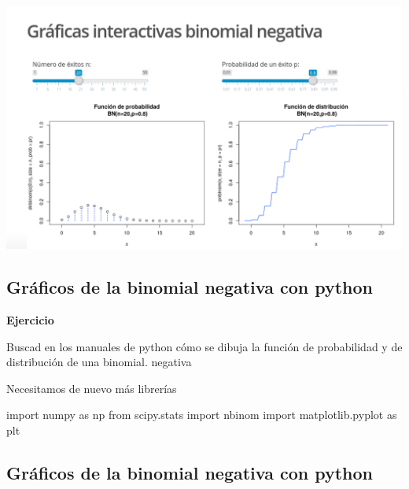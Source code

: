 \documentclass[]{book}
\newenvironment{Shaded}{\begin{snugshade}}{\end{snugshade}}
\newcommand{\ImportTok}[1]{#1}
\newcommand{\NormalTok}[1]{#1}
\begin{document}
\href{https://github.com/joanby/probabilidad}{\includegraphics{Images/noshinyImages/interactiva_binomial_negativa1.png}}

\hypertarget{gruxe1ficos-de-la-binomial-negativa-con-python}{%
\subsection{Gráficos de la binomial negativa con python}\label{gruxe1ficos-de-la-binomial-negativa-con-python}}

\textbf{Ejercicio}

Buscad en los manuales de python cómo se dibuja la función de probabilidad y de distribución de una binomial.
negativa

Necesitamos de nuevo más librerías

\begin{Shaded}
\begin{Highlighting}[]
\ImportTok{import}\NormalTok{ numpy }\ImportTok{as}\NormalTok{ np}
\ImportTok{from}\NormalTok{ scipy.stats }\ImportTok{import}\NormalTok{ nbinom}
\ImportTok{import}\NormalTok{ matplotlib.pyplot }\ImportTok{as}\NormalTok{ plt}
\end{Highlighting}
\end{Shaded}

\hypertarget{gruxe1ficos-de-la-binomial-negativa-con-python-1}{%
\subsection{Gráficos de la binomial negativa con python}\label{gruxe1ficos-de-la-binomial-negativa-con-python-1}}
\end{document}
